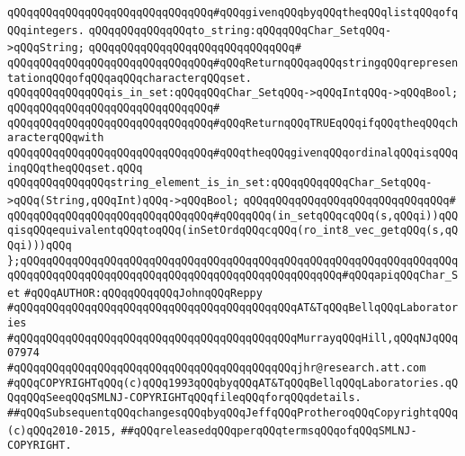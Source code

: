 \verb|qQQqqQQqqQQqqQQqqQQqqQQqqQQqqQQq#qQQqgivenqQQqbyqQQqtheqQQqlistqQQqofqQQqintegers.|\newline
\newline
\verb|qQQqqQQqqQQqqQQqto_string:qQQqqQQqChar_SetqQQq->qQQqString;|\newline
\verb|qQQqqQQqqQQqqQQqqQQqqQQqqQQqqQQq#|\newline
\verb|qQQqqQQqqQQqqQQqqQQqqQQqqQQqqQQq#qQQqReturnqQQqaqQQqstringqQQqrepresentationqQQqofqQQqaqQQqcharacterqQQqset.|\newline
\newline
\verb|qQQqqQQqqQQqqQQqis_in_set:qQQqqQQqChar_SetqQQq->qQQqIntqQQq->qQQqBool;|\newline
\verb|qQQqqQQqqQQqqQQqqQQqqQQqqQQqqQQq#|\newline
\verb|qQQqqQQqqQQqqQQqqQQqqQQqqQQqqQQq#qQQqReturnqQQqTRUEqQQqifqQQqtheqQQqcharacterqQQqwith|\newline
\verb|qQQqqQQqqQQqqQQqqQQqqQQqqQQqqQQq#qQQqtheqQQqgivenqQQqordinalqQQqisqQQqinqQQqtheqQQqset.qQQq|\newline
\newline
\verb|qQQqqQQqqQQqqQQqstring_element_is_in_set:qQQqqQQqqQQqChar_SetqQQq->qQQq(String,qQQqInt)qQQq->qQQqBool;|\newline
\verb|qQQqqQQqqQQqqQQqqQQqqQQqqQQqqQQq#|\newline
\verb|qQQqqQQqqQQqqQQqqQQqqQQqqQQqqQQq#qQQqqQQq(in_setqQQqcqQQq(s,qQQqi))qQQqisqQQqequivalentqQQqtoqQQq(inSetOrdqQQqcqQQq(ro_int8_vec_getqQQq(s,qQQqi)))qQQq|\newline
\newline
\verb|};qQQqqQQqqQQqqQQqqQQqqQQqqQQqqQQqqQQqqQQqqQQqqQQqqQQqqQQqqQQqqQQqqQQqqQQqqQQqqQQqqQQqqQQqqQQqqQQqqQQqqQQqqQQqqQQqqQQqqQQq#qQQqapiqQQqChar_Set|\newline
\newline
\newline
\newline
\verb|#qQQqAUTHOR:qQQqqQQqqQQqJohnqQQqReppy|\newline
\verb|#qQQqqQQqqQQqqQQqqQQqqQQqqQQqqQQqqQQqqQQqqQQqAT&TqQQqBellqQQqLaboratories|\newline
\verb|#qQQqqQQqqQQqqQQqqQQqqQQqqQQqqQQqqQQqqQQqqQQqMurrayqQQqHill,qQQqNJqQQq07974|\newline
\verb|#qQQqqQQqqQQqqQQqqQQqqQQqqQQqqQQqqQQqqQQqqQQqjhr@research.att.com|\newline
\newline
\verb|#qQQqCOPYRIGHTqQQq(c)qQQq1993qQQqbyqQQqAT&TqQQqBellqQQqLaboratories.qQQqqQQqSeeqQQqSMLNJ-COPYRIGHTqQQqfileqQQqforqQQqdetails.|\newline
\verb|##qQQqSubsequentqQQqchangesqQQqbyqQQqJeffqQQqProtheroqQQqCopyrightqQQq(c)qQQq2010-2015,|\newline
\verb|##qQQqreleasedqQQqperqQQqtermsqQQqofqQQqSMLNJ-COPYRIGHT.|\newline

